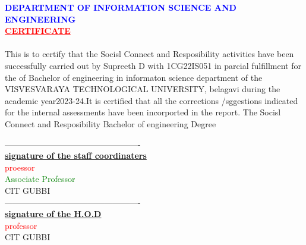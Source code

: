\documentclass[a4paper,15pt]{article}
\begin{document}
\textcolor{blue}{\textbf{DEPARTMENT OF INFORMATION SCIENCE AND ENGINEERING}}\\
\vspace{5mm}
\centering
\vspace{5mm}
\textcolor{red}{\underline{\textbf{CERTIFICATE}}}\\
\paragraph{}
This is to certify that the Socisl Connect and Resposibility activities have been successfully carried out by Supreeth D with 1CG22IS051 in parcial fulfillment for the of Bachelor of engineering in informaton science department of the VISVESVARAYA TECHNOLOGICAL UNIVERSITY, belagavi during the academic year2023-24.It is certified that all the corrections /sggestions indicated for the internal assessments have been incorported in the report. The Socisl Connect and Resposibility Bachelor of engineering Degree
\begin{center}
\centering
-------------------------------------------------\\
\vspace{5mm}
\underline{\textbf{signature of the staff coordinaters}}\\
\vspace{5mm}
\textcolor{red}{proessor}\\
\textcolor{green}{Associate Professor}\\
CIT GUBBI\\
\vspace{10mm}
\centering
-------------------------------------------------\\
\underline{\textbf{signature of the H.O.D}}\\
\vspace{3mm}
\textcolor{red}{professor}\\
CIT GUBBI\\
\end{center}
\end{document}
